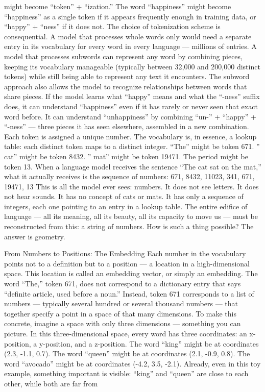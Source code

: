 might become “token” + “ization.” The word “happiness” might become “happiness” as a single token if it appears frequently enough in training data, or “happy” + “ness” if it does not. The choice of tokenization scheme is consequential. A model that processes whole words only would need a separate entry in its vocabulary for every word in every language — millions of entries. A model that processes subwords can represent any word by combining pieces, keeping its vocabulary manageable (typically between 32,000 and 200,000 distinct tokens) while still being able to represent any text it encounters. The subword approach also allows the model to recognize relationships between words that share pieces. If the model learns what “happy” means and what the “-ness” suffix does, it can understand “happiness” even if it has rarely or never seen that exact word before. It can understand “unhappiness” by combining “un-” + “happy” + “-ness” — three pieces it has seen elsewhere, assembled in a new combination. Each token is assigned a unique number. The vocabulary is, in essence, a lookup table: each distinct token maps to a distinct integer. “The” might be token 671. ” cat” might be token 8432. ” mat” might be token 19471. The period might be token 13. When a language model receives the sentence “The cat sat on the mat,” what it actually receives is the sequence of numbers: 671, 8432, 11023, 341, 671, 19471, 13 This is all the model ever sees: numbers. It does not see letters. It does not hear sounds. It has no concept of cats or mats. It has only a sequence of integers, each one pointing to an entry in a lookup table. The entire edifice of language — all its meaning, all its beauty, all its capacity to move us — must be reconstructed from this: a string of numbers. How is such a thing possible? The answer is geometry.

From Numbers to Positions: The Embedding Each number in the vocabulary points not to a definition but to a position — a location in a high-dimensional space. This location is called an embedding vector, or simply an embedding. The word “The,” token 671, does not correspond to a dictionary entry that says “definite article, used before a noun.” Instead, token 671 corresponds to a list of numbers — typically several hundred or several thousand numbers — that together specify a point in a space of that many dimensions. To make this concrete, imagine a space with only three dimensions — something you can picture. In this three-dimensional space, every word has three coordinates: an x-position, a y-position, and a z-position. The word “king” might be at coordinates (2.3, -1.1, 0.7). The word “queen” might be at coordinates (2.1, -0.9, 0.8). The word “avocado” might be at coordinates (-4.2, 3.5, -2.1). Already, even in this toy example, something important is visible: “king” and “queen” are close to each other, while both are far from

